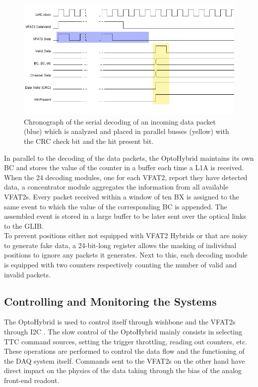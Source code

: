       \begin{figure}[h!]
        \centering
        \includegraphics[width=\textwidth]{img/II-3-test-beam/tkdata-chrono.png}
        \caption{Chronograph of the serial decoding of an incoming data packet (blue) which is analyzed and placed in parallel busses (yellow) with the CRC check bit and the hit present bit.}
        \label{fig:II-3-tkdata-chrono}
      \end{figure}

      In parallel to the decoding of the data packets, the OptoHybrid maintains its own BC and stores the value of the counter in a buffer each time a L1A is received. When the 24 decoding modules, one for each VFAT2, report they have detected data, a concentrator module aggregates the information from all available VFAT2s. Every packet received within a window of ten BX is assigned to the same event to which the value of the corresponding BC is appended. The assembled event is stored in a large buffer to be later sent over the optical links to the GLIB. \\

      To prevent positions either not equipped with VFAT2 Hybrids or that are noisy to generate fake data, a 24-bit-long register allows the masking of individual positions to ignore any packets it generates. Next to this, each decoding module is equipped with two counters respectively counting the number of valid and invalid packets.

    \subsection{Controlling and Monitoring the Systems}

      The OptoHybrid is used to control itself through wishbone and the VFAT2s through I2C \cite{i2c}. The slow control of the OptoHybrid mainly consists in selecting TTC command sources, setting the trigger throttling, reading out counters, etc. These operations are performed to control the data flow and the functioning of the DAQ system itself. Commands sent to the VFAT2s on the other hand have direct impact on the physics of the data taking through the bias of the analog front-end readout. \\


